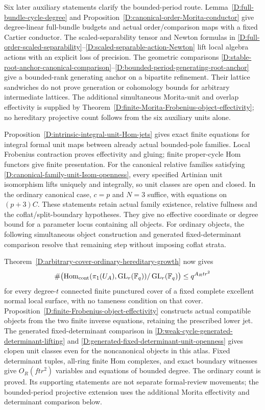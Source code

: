Six later auxiliary statements clarify the bounded-period route.
Lemma~\ref{D:full-bundle-cycle-degree} and
Proposition~\ref{D:canonical-order-Morita-conductor} give
degree-linear full-bundle budgets and actual order/comparison
maps with a fixed Cartier conductor. The scaled-separability
tensor and Newton formulas in
\ref{D:full-order-scaled-separability}--\ref{D:scaled-separable-action-Newton}
lift local algebra actions with an explicit loss of precision.
The geometric comparisons
\ref{D:stable-root-anchor-canonical-comparison}--\ref{D:bounded-period-generating-root-anchor}
give a bounded-rank generating anchor on a bipartite refinement.
Their lattice sandwiches do not prove generation or cohomology
bounds for arbitrary intermediate lattices. The additional
simultaneous Morita-unit and overlap effectivity is supplied by
Theorem~\ref{D:finite-Morita-Frobenius-object-effectivity};
no hereditary projective count follows from the six auxiliary
units alone.

Proposition~\ref{D:intrinsic-integral-unit-Hom-jets} gives exact
finite equations for integral formal unit maps between already
actual bounded-pole families. Local Frobenius contraction proves
effectivity and gluing; finite proper-cycle Hom functors give
finite presentation. For the canonical relative families satisfying
\ref{D:canonical-family-unit-Isom-openness}, every specified
Artinian unit isomorphism lifts uniquely and integrally, so unit
classes are open and closed. In the ordinary canonical case,
$c=p$ and $N=3$ suffice, with equations on $(p+3)C$.
These statements retain actual family existence, relative fullness
and the coflat/split-boundary hypotheses. They give no effective
coordinate or degree bound for a parameter locus containing all
objects. For ordinary objects, the following simultaneous object
construction and generated fixed-determinant comparison resolve
that remaining step without imposing coflat strata.

Theorem~\ref{D:arbitrary-cover-ordinary-hereditary-growth} now gives
\[
 \#\bigl(\operatorname{Hom}_{\rm cont}
 (\pi_1(U_A),\operatorname{GL}_r(\mathbb F_q))
       /\operatorname{GL}_r(\mathbb F_q)\bigr)
                         \le q^{A_Rtr^2}
\]
for every degree-$t$ connected finite punctured cover of a fixed
complete excellent normal local surface, with no tameness condition
on that cover. Proposition~\ref{D:finite-Frobenius-object-effectivity}
constructs actual compatible objects from the two finite inverse
equations, retaining the prescribed lower jet. The generated
fixed-determinant comparison in
\ref{D:weak-cycle-generated-determinant-lifting} and
\ref{D:generated-fixed-determinant-unit-openness} gives clopen
unit classes even for the noncanonical objects in this atlas.
Fixed determinant tuples, all-ring finite Hom complexes, and exact
boundary witnesses give $O_R(ftr^2)$ variables and equations of
bounded degree. The ordinary count is proved. Its supporting
statements are not separate formal-review movements; the
bounded-period projective extension uses the additional
Morita effectivity and determinant comparison below.

